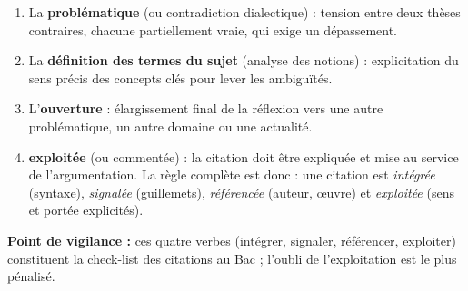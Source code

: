 \documentclass[11pt]{article}
\begin{document}
\begin{corrige}
\begin{enumerate}
    \item La \textbf{problématique} (ou contradiction dialectique) : tension entre deux thèses contraires, chacune partiellement vraie, qui exige un dépassement.
    \item La \textbf{définition des termes du sujet} (analyse des notions) : explicitation du sens précis des concepts clés pour lever les ambiguïtés.
    \item L'\textbf{ouverture} : élargissement final de la réflexion vers une autre problématique, un autre domaine ou une actualité.
    \item \textbf{exploitée} (ou commentée) : la citation doit être expliquée et mise au service de l'argumentation. La règle complète est donc : une citation est \emph{intégrée} (syntaxe), \emph{signalée} (guillemets), \emph{référencée} (auteur, œuvre) et \emph{exploitée} (sens et portée explicités).
\end{enumerate}
\textbf{Point de vigilance :} ces quatre verbes (intégrer, signaler, référencer, exploiter) constituent la check-list des citations au Bac ; l'oubli de l'exploitation est le plus pénalisé.
\end{corrige}
\end{document}
